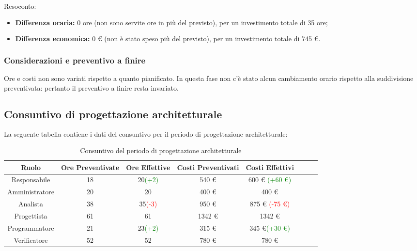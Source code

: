 Resoconto:

\begin{itemize}
	\item \textbf{Differenza oraria:} 0 ore (non sono servite ore in più del previsto), per un investimento totale di 35 ore;
	\item \textbf{Differenza economica:} 0 \euro{} (non è stato speso più del previsto), per un investimento totale di 745 \euro{}.
\end{itemize}
	
\subsubsection{Considerazioni e preventivo a finire}
Ore e costi non sono variati rispetto a quanto pianificato. \newline{}
In questa fase non c'è stato alcun cambiamento orario rispetto alla suddivisione preventivata: pertanto il preventivo a finire resta invariato.



\subsection{Consuntivo di progettazione architetturale}
La seguente tabella contiene i dati del consuntivo per il periodo di progettazione architetturale:
\begin{table}[H]
		\begin{center}
			\setlength{\aboverulesep}{0pt}
			\setlength{\belowrulesep}{0pt}
			\setlength{\extrarowheight}{.75ex}
			\begin{tabular}{ c c c c c c c c }
				\rowcolor{AzzurroGruppo!30} 
				\textbf{Ruolo} & \textbf{Ore Preventivate} & \textbf{Ore Effettive} & \textbf{Costi Preventivati} & \textbf{Costi Effettivi}\\
				\toprule
				Responsabile   & 18 & 20\textcolor{green}{(+2)} & 540 \euro{}  & 600 \euro{} \textcolor{green}{(+60 \euro{})}\\
				Amministratore & 20 & 20 & 400 \euro{}  & 400 \euro{} \\
				Analista       & 38 & 35\textcolor{red}{(-3)} & 950 \euro{}  & 875 \euro{} \textcolor{red}{(-75 \euro{})} \\
				Progettista    & 61 & 61 & 1342 \euro{} & 1342 \euro{} \\
				Programmatore  & 21 & 23\textcolor{green}{(+2)} & 315 \euro{}  & 345 \euro{}\textcolor{green}{(+30 \euro{})} \\
				Verificatore   & 52 & 52 & 780 \euro{}  & 780 \euro{} \\
				\bottomrule
			\end{tabular}
			\caption{Consuntivo del periodo di progettazione architetturale}
		\end{center}
	\end{table}
	
